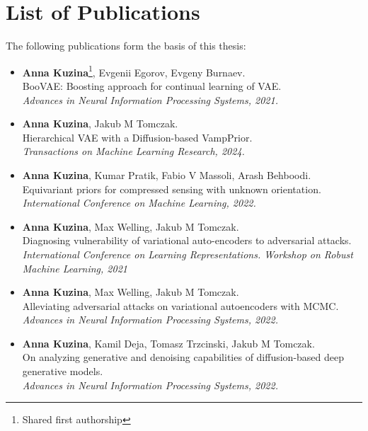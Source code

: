 \chapter*{List of Publications}\label{chapter:papers}

The following publications form the basis of this thesis:
\begin{itemize}[leftmargin=20pt, rightmargin=10pt]
    \item \textbf{Anna Kuzina}\footnote[1]{Shared first authorship}, Evgenii Egorov\footnotemark[1], Evgeny Burnaev. \\
    BooVAE: Boosting approach for continual learning of VAE. \\
    \textit{Advances in Neural Information Processing Systems, 2021.}
    \item \textbf{Anna Kuzina},  Jakub M Tomczak. \\ 
    Hierarchical VAE with a Diffusion-based VampPrior.\\
    \textit{Transactions on Machine Learning Research, 2024.}
    \item \textbf{Anna Kuzina}, Kumar Pratik, Fabio V Massoli, Arash Behboodi.\\ 
    Equivariant priors for compressed sensing with unknown orientation. \\
    \textit{International Conference on Machine Learning, 2022.}
    \item \textbf{Anna Kuzina}, Max Welling, Jakub M Tomczak.  \\
    Diagnosing vulnerability of variational auto-encoders to adversarial attacks. \\
    \textit{International Conference on Learning Representations. Workshop on Robust Machine Learning, 2021}
    \item \textbf{Anna Kuzina}, Max Welling, Jakub M Tomczak.  \\
    Alleviating adversarial attacks on variational autoencoders with MCMC. \\
    \textit{Advances in Neural Information Processing Systems, 2022.}
    \item \textbf{Anna Kuzina}\footnotemark[1], Kamil Deja\footnotemark[1], Tomasz Trzcinski, Jakub M Tomczak. \\
    On analyzing generative and denoising capabilities of diffusion-based deep generative models. \\
    \textit{Advances in Neural Information Processing Systems, 2022.}

\end{itemize}

